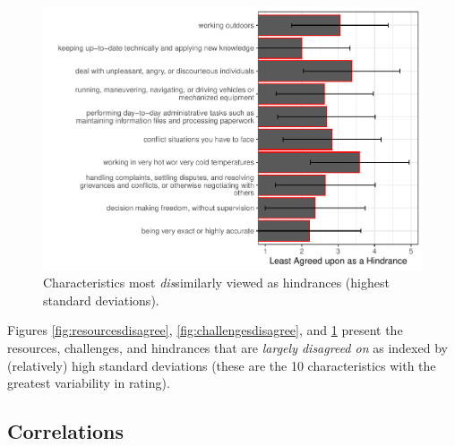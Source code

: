 \documentclass[
  man]{apa6}
\begin{document}
\begin{figure}
\centering
\includegraphics{Submission_files/figure-latex/hindrancesdisagree-1.pdf}
\caption{\label{fig:hindrancesdisagree}Characteristics most \emph{dis}similarly viewed as hindrances (highest standard deviations).}
\end{figure}

Figures \ref{fig:resourcesdisagree}, \ref{fig:challengesdisagree}, and \ref{fig:hindrancesdisagree} present the resources, challenges, and hindrances that are \emph{largely disagreed on} as indexed by (relatively) high standard deviations (these are the 10 characteristics with the greatest variability in rating).

\hypertarget{correlations}{%
\subsection{Correlations}\label{correlations}}
\end{document}
